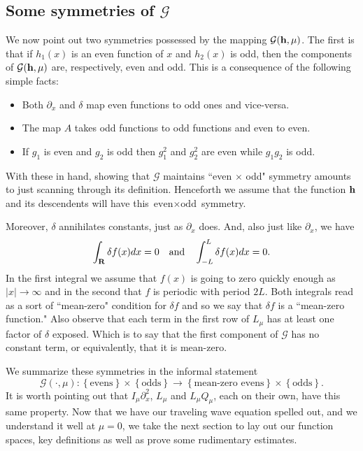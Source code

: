 \documentclass[12pt]{amsart}
\numberwithin{equation}{section}
\newcommand{\be}{\begin{equation}}
\newcommand{\ee}{\end{equation}}
\newcommand{\mand}{\quad \text{and}\quad}
\newcommand{\R}{{\bf{R}}}
\newcommand{\hb}{{\bf{h}}}
\newcommand{\G}{{\mathcal{G}}}
\begin{document}
\subsection{Some symmetries of $\G$}
We now point out two  symmetries possessed by the mapping $\G(\hb,\mu)$. The first is that 
if $h_1(x)$ is an even function of $x$ and $h_2(x)$ is odd, then the components of $\G(\hb,\mu)$ are, respectively, even and odd. This is
a consequence of the following simple facts:
\begin{itemize}
\item Both $\partial_x$ and $\delta$ map even functions to odd ones and vice-versa.
\item The map $A$ takes odd functions to odd functions and even to even. 
\item If $g_1$ is even and $g_2$ is odd then $g_1^2$ and $g_2^2$ are even while $g_1 g_2$ is odd.
\end{itemize}
With these in hand, showing that $\G$ maintains  ``even $\times$ odd" symmetry  amounts to just scanning through its definition.
Henceforth we assume that the function $\hb$ and its descendents will have this $\text{even} \times \text{odd}$ symmetry.  

Moreover, $\delta$ annihilates constants, just as $\partial_x$ does. And, also just like
$\partial_x$, we have
$$
\int_{\R} \delta f(x) dx =0 \mand \int_{-L}^L \delta f(x) dx = 0.
$$
In the first integral we assume that $f(x)$ is going to zero quickly enough as $|x| \to \infty$ and in the second that $f$ is periodic with period $2L$.
Both integrals read as a sort of ``mean-zero" condition for $\delta f$ and so we say that $\delta f$ is a ``mean-zero function."
Also observe that each term in the first row of $L_\mu$ 
has at least one factor of $\delta$ exposed. Which is to say that the first component of $\G$ has no constant term, or equivalently,
that it is  mean-zero.

We summarize these symmetries in the informal statement
\be\label{G sym}
\G(\cdot,\mu) : \left\{\text{evens} \right\} \times  \left\{\text{odds} \right\}  \to 
 \left\{ \text{mean-zero evens} \right\} \times  \left\{ \text{odds} \right\} .
\ee
It is worth pointing out that $I_\mu \partial_x^2$, $L_\mu$ and $L_\mu Q_\mu$, each on their own, have this same property.
Now that we have our traveling wave equation spelled out, and we understand it well at $\mu=0$,
we take the next section to lay out our function spaces, key definitions as well as prove some rudimentary estimates. 
\end{document}
